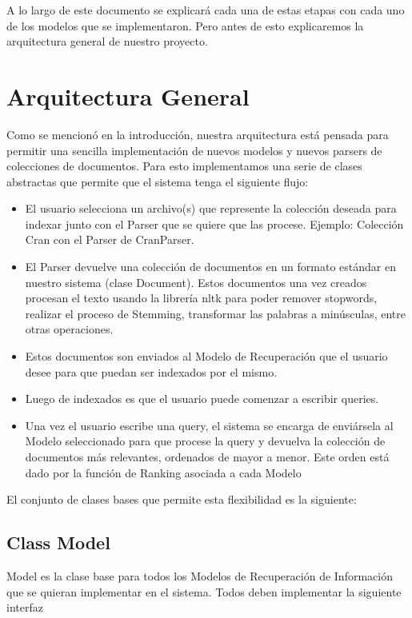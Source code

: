 \documentclass[12pt]{article}
\begin{document}
A lo largo de este documento se explicará cada una de estas etapas con cada uno de los modelos que se implementaron.
Pero antes de esto explicaremos la arquitectura general de nuestro proyecto.

\section{Arquitectura General}
Como se mencionó en la introducción, nuestra arquitectura está pensada para permitir una sencilla implementación
de nuevos modelos y nuevos parsers de colecciones de documentos. Para esto implementamos una serie de clases abstractas
que permite que el sistema tenga el siguiente flujo:

\begin{itemize}
	\item El usuario selecciona un archivo(s) que represente la colección deseada para indexar
	      junto con el Parser que se quiere que las procese. Ejemplo: Colección Cran con el Parser
	      de CranParser.
	\item El Parser devuelve una colección de documentos en un formato estándar en nuestro
	      sistema (clase Document). Estos documentos una vez creados procesan el texto usando
	      la librería nltk para poder remover stopwords, realizar el proceso de Stemming,
	      transformar las palabras a minúsculas, entre otras operaciones.
	\item Estos documentos son enviados al Modelo de Recuperación que el usuario desee para que
	      puedan ser indexados por el mismo.
	\item Luego de indexados es que el usuario puede comenzar a escribir queries.
	\item Una vez el usuario escribe una query, el sistema se encarga de enviársela al Modelo
	      seleccionado para que procese la query y devuelva la colección de documentos más
	      relevantes, ordenados de mayor a menor. Este orden está dado por la función de Ranking
	      asociada a cada Modelo
\end{itemize}

El conjunto de clases bases que permite esta flexibilidad es la siguiente:

\subsection{Class Model}

Model es la clase base para todos los Modelos de Recuperación de Información que
se quieran implementar en el sistema. Todos deben implementar la siguiente interfaz
\end{document}
